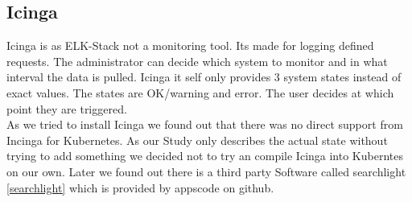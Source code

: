 \subsection{Icinga}
\label{Icinga}
Icinga is as ELK-Stack not a monitoring tool. Its made for logging defined requests. The administrator can decide which system to monitor and in what interval the data is pulled.
Icinga it self only provides 3 system states instead of exact values. The states are OK/warning and error. The user decides at which point they are triggered.\\
As we tried to install Icinga we found out that there was no direct support from Incinga for Kubernetes. As our Study only describes the actual state without trying to add something we decided not to try an compile Icinga into Kuberntes on our own. Later we found out there is a third party Software called searchlight \ref{searchlight} which is provided by appscode on github.
 